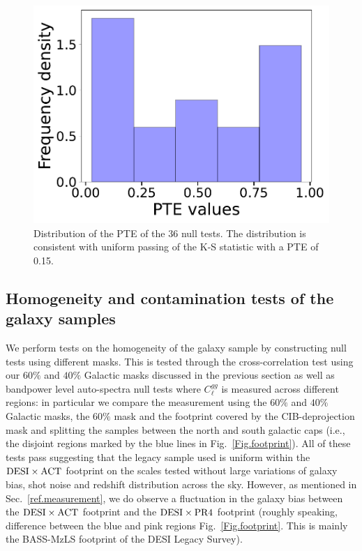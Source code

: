 \documentclass[twocolumn]{aastex631}
\begin{document}
{\begin{table}
\begin{tabular}{c c c c }
    \end{tabular}
\end{table}


 \begin{figure}
  \includegraphics[width=\linewidth]{figures/hist.pdf}
  \caption{Distribution of the PTE of the 36 null tests. The distribution is consistent with uniform passing of the K-S statistic with a PTE of 0.15.} 
  \label{Fig.histnull}
\end{figure}

\subsection{Homogeneity and contamination tests of the galaxy samples} \label{null_gal}

We perform tests on the homogeneity of the galaxy sample by constructing null tests using different masks.
This is tested through the cross-correlation test using our $60\%$ and $40\%$ Galactic masks discussed in the previous section as well as bandpower level auto-spectra null tests where $C^{gg}_\ell$ is measured across different regions: in particular we compare the measurement using the $60\%$ and $40\%$ Galactic masks, the $60\%$ mask and the footprint covered by the CIB-deprojection mask and splitting the samples between the north and south galactic caps {(i.e., the disjoint regions marked by the blue lines in Fig.~\ref{Fig.footprint})}. All of these tests pass suggesting that the legacy sample used is uniform {within the ${\rm DESI}\times {\rm ACT}$ footprint} on the scales tested without large variations of galaxy bias, shot noise and redshift distribution across the sky. {However, as mentioned in Sec.~\ref{ref.measurement}, we do observe a fluctuation in the galaxy bias between the ${\rm DESI}\times {\rm ACT}$ footprint and the ${\rm DESI}\times {\rm PR4}$ footprint (roughly speaking, difference between the blue and pink regions Fig.~\ref{Fig.footprint}. This is mainly the BASS-MzLS footprint of the DESI Legacy Survey). }



}
\end{document}
